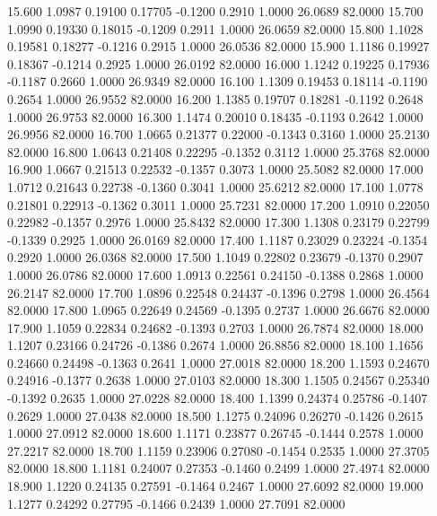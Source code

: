   15.600   1.0987   0.19100   0.17705  -0.1200   0.2910   1.0000  26.0689  82.0000
  15.700   1.0990   0.19330   0.18015  -0.1209   0.2911   1.0000  26.0659  82.0000
  15.800   1.1028   0.19581   0.18277  -0.1216   0.2915   1.0000  26.0536  82.0000
  15.900   1.1186   0.19927   0.18367  -0.1214   0.2925   1.0000  26.0192  82.0000
  16.000   1.1242   0.19225   0.17936  -0.1187   0.2660   1.0000  26.9349  82.0000
  16.100   1.1309   0.19453   0.18114  -0.1190   0.2654   1.0000  26.9552  82.0000
  16.200   1.1385   0.19707   0.18281  -0.1192   0.2648   1.0000  26.9753  82.0000
  16.300   1.1474   0.20010   0.18435  -0.1193   0.2642   1.0000  26.9956  82.0000
  16.700   1.0665   0.21377   0.22000  -0.1343   0.3160   1.0000  25.2130  82.0000
  16.800   1.0643   0.21408   0.22295  -0.1352   0.3112   1.0000  25.3768  82.0000
  16.900   1.0667   0.21513   0.22532  -0.1357   0.3073   1.0000  25.5082  82.0000
  17.000   1.0712   0.21643   0.22738  -0.1360   0.3041   1.0000  25.6212  82.0000
  17.100   1.0778   0.21801   0.22913  -0.1362   0.3011   1.0000  25.7231  82.0000
  17.200   1.0910   0.22050   0.22982  -0.1357   0.2976   1.0000  25.8432  82.0000
  17.300   1.1308   0.23179   0.22799  -0.1339   0.2925   1.0000  26.0169  82.0000
  17.400   1.1187   0.23029   0.23224  -0.1354   0.2920   1.0000  26.0368  82.0000
  17.500   1.1049   0.22802   0.23679  -0.1370   0.2907   1.0000  26.0786  82.0000
  17.600   1.0913   0.22561   0.24150  -0.1388   0.2868   1.0000  26.2147  82.0000
  17.700   1.0896   0.22548   0.24437  -0.1396   0.2798   1.0000  26.4564  82.0000
  17.800   1.0965   0.22649   0.24569  -0.1395   0.2737   1.0000  26.6676  82.0000
  17.900   1.1059   0.22834   0.24682  -0.1393   0.2703   1.0000  26.7874  82.0000
  18.000   1.1207   0.23166   0.24726  -0.1386   0.2674   1.0000  26.8856  82.0000
  18.100   1.1656   0.24660   0.24498  -0.1363   0.2641   1.0000  27.0018  82.0000
  18.200   1.1593   0.24670   0.24916  -0.1377   0.2638   1.0000  27.0103  82.0000
  18.300   1.1505   0.24567   0.25340  -0.1392   0.2635   1.0000  27.0228  82.0000
  18.400   1.1399   0.24374   0.25786  -0.1407   0.2629   1.0000  27.0438  82.0000
  18.500   1.1275   0.24096   0.26270  -0.1426   0.2615   1.0000  27.0912  82.0000
  18.600   1.1171   0.23877   0.26745  -0.1444   0.2578   1.0000  27.2217  82.0000
  18.700   1.1159   0.23906   0.27080  -0.1454   0.2535   1.0000  27.3705  82.0000
  18.800   1.1181   0.24007   0.27353  -0.1460   0.2499   1.0000  27.4974  82.0000
  18.900   1.1220   0.24135   0.27591  -0.1464   0.2467   1.0000  27.6092  82.0000
  19.000   1.1277   0.24292   0.27795  -0.1466   0.2439   1.0000  27.7091  82.0000

